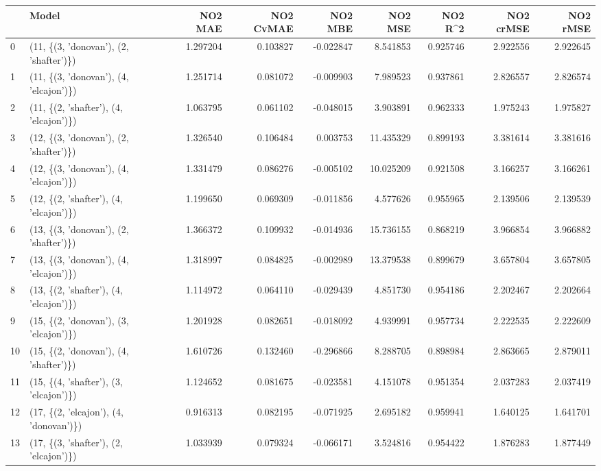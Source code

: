 \begin{tabular}{llrrrrrrr}
\toprule
{} &                                   Model &   NO2 MAE &  NO2 CvMAE &   NO2 MBE &    NO2 MSE &   NO2 R\textasciicircum2 &  NO2 crMSE &  NO2 rMSE \\
\midrule
0  &  (11, \{(3, 'donovan'), (2, 'shafter')\}) &  1.297204 &   0.103827 & -0.022847 &   8.541853 &  0.925746 &   2.922556 &  2.922645 \\
1  &  (11, \{(3, 'donovan'), (4, 'elcajon')\}) &  1.251714 &   0.081072 & -0.009903 &   7.989523 &  0.937861 &   2.826557 &  2.826574 \\
2  &  (11, \{(2, 'shafter'), (4, 'elcajon')\}) &  1.063795 &   0.061102 & -0.048015 &   3.903891 &  0.962333 &   1.975243 &  1.975827 \\
3  &  (12, \{(3, 'donovan'), (2, 'shafter')\}) &  1.326540 &   0.106484 &  0.003753 &  11.435329 &  0.899193 &   3.381614 &  3.381616 \\
4  &  (12, \{(3, 'donovan'), (4, 'elcajon')\}) &  1.331479 &   0.086276 & -0.005102 &  10.025209 &  0.921508 &   3.166257 &  3.166261 \\
5  &  (12, \{(2, 'shafter'), (4, 'elcajon')\}) &  1.199650 &   0.069309 & -0.011856 &   4.577626 &  0.955965 &   2.139506 &  2.139539 \\
6  &  (13, \{(3, 'donovan'), (2, 'shafter')\}) &  1.366372 &   0.109932 & -0.014936 &  15.736155 &  0.868219 &   3.966854 &  3.966882 \\
7  &  (13, \{(3, 'donovan'), (4, 'elcajon')\}) &  1.318997 &   0.084825 & -0.002989 &  13.379538 &  0.899679 &   3.657804 &  3.657805 \\
8  &  (13, \{(2, 'shafter'), (4, 'elcajon')\}) &  1.114972 &   0.064110 & -0.029439 &   4.851730 &  0.954186 &   2.202467 &  2.202664 \\
9  &  (15, \{(2, 'donovan'), (3, 'elcajon')\}) &  1.201928 &   0.082651 & -0.018092 &   4.939991 &  0.957734 &   2.222535 &  2.222609 \\
10 &  (15, \{(2, 'donovan'), (4, 'shafter')\}) &  1.610726 &   0.132460 & -0.296866 &   8.288705 &  0.898984 &   2.863665 &  2.879011 \\
11 &  (15, \{(4, 'shafter'), (3, 'elcajon')\}) &  1.124652 &   0.081675 & -0.023581 &   4.151078 &  0.951354 &   2.037283 &  2.037419 \\
12 &  (17, \{(2, 'elcajon'), (4, 'donovan')\}) &  0.916313 &   0.082195 & -0.071925 &   2.695182 &  0.959941 &   1.640125 &  1.641701 \\
13 &  (17, \{(3, 'shafter'), (2, 'elcajon')\}) &  1.033939 &   0.079324 & -0.066171 &   3.524816 &  0.954422 &   1.876283 &  1.877449 \\

\end{tabular}

